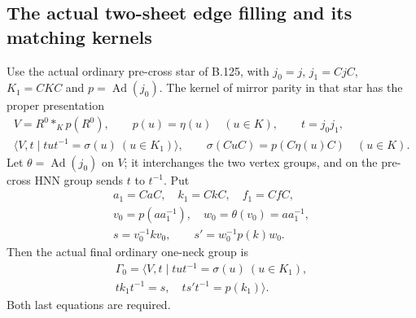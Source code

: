 \subsection*{The actual two-sheet edge filling and its matching kernels}

\label{stmt:B134}
Use the actual ordinary pre-cross star of B.125, with
$j_0=j$, $j_1=CjC$, $K_1=CKC$ and $p=\operatorname{Ad}(j_0)$.
The kernel of mirror parity in that star has the proper presentation
\begin{equation}\label{eq:B134-pre-HNN}
 \begin{gathered}
 V=R^0*_{K}p(R^0),\qquad p(u)=\eta(u)\quad(u\in K),\qquad t=j_0j_1,\\
 \langle V,t\mid tut^{-1}=\sigma(u)\ (u\in K_1)\rangle,
 \qquad \sigma(CuC)=p(C\eta(u)C)\quad(u\in K).
 \end{gathered}
\end{equation}
Let $\theta=\operatorname{Ad}(j_0)$ on $V$; it interchanges the
two vertex groups, and on the pre-cross HNN group sends $t$ to
$t^{-1}$. Put
\begin{equation}\label{eq:B134-actual-words}
 \begin{gathered}
 a_1=CaC,\quad k_1=CkC,\quad f_1=CfC,\\
 v_0=p(aa_1^{-1}),\quad w_0=\theta(v_0)=aa_1^{-1},\\
 s=v_0^{-1}kv_0,\qquad s'=w_0^{-1}p(k)w_0.
 \end{gathered}
\end{equation}
Then the actual final ordinary one-neck group is
\begin{equation}\label{eq:B134-two-cross-presentation}
 \begin{gathered}
 \Gamma_0=\langle V,t\mid
   tut^{-1}=\sigma(u)\ (u\in K_1),\\
   tk_1t^{-1}=s,\quad ts't^{-1}=p(k_1)\rangle.
 \end{gathered}
\end{equation}
Both last equations are required.

